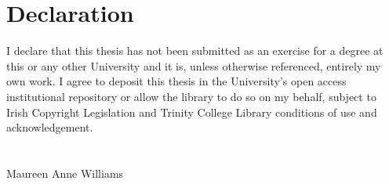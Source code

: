 \chapter*{Declaration}

I declare that this thesis has not been submitted as an exercise for a degree at this or any other University and it is, unless otherwise referenced, entirely my own work. I agree to deposit this thesis in the University's open access institutional repository or allow the library to do so on my behalf, subject to Irish Copyright Legislation and Trinity College Library conditions of use and acknowledgement.
\\
\\
\\

Maureen Anne Williams